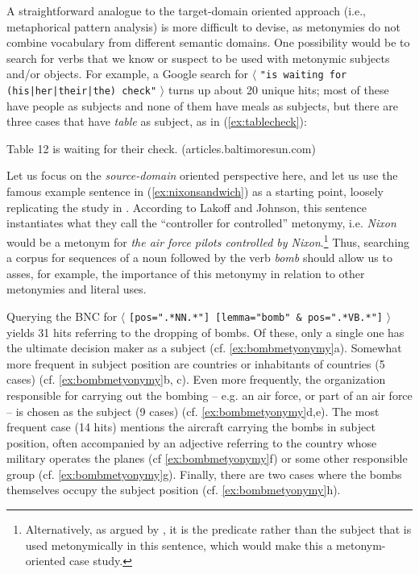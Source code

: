 A straightforward analogue to the target\hyp{}domain oriented approach (i.e., metaphorical  pattern analysis)  is more difficult to devise, as metonymies  do not combine vocabulary from different semantic  domains. One possibility would be to search for verbs  that we know or suspect to be used with metonymic subjects and\slash or objects. For example, a Google search for $\langle$ \texttt{"is waiting for (his|her|their|the) check"} $\rangle$ turns up about 20 unique hits; most of these have people as subjects and none of them have meals as subjects, but there are three cases that have \textit{table} as subject, as in (\ref{ex:tablecheck}):

\begin{exe}
\ex Table 12 is waiting for their check. (articles.baltimoresun.com)
\label{ex:tablecheck}
\end{exe}

Let us focus on the \textit{source\hyp{}domain} oriented perspective here, and let us use the famous example sentence in (\ref{ex:nixonsandwich}) as a starting point, loosely replicating  the study in \citet{stefanowitsch_metonymies_2015}. According to Lakoff and Johnson, this sentence instantiates what they call the ``controller for controlled'' metonymy,  i.e. \textit{Nixon} would be a metonym for \textit{the air force pilots controlled by Nixon}.\footnote{Alternatively, as argued by \citet{stallard_two_1993}, it is the predicate rather than the subject that is used metonymically  in this sentence, which would make this a metonym\hyp{}oriented case study.} Thus, searching a corpus for sequences of a noun  followed by the verb  \textit{bomb} should allow us to asses, for example, the importance of this metonymy  in relation to other metonymies and literal  uses.

Querying the BNC  for $\langle$ \texttt{[pos=".*NN.*"] [lemma="bomb" \& pos=".*VB.*"]} $\rangle$ yields 31 hits referring to the dropping of bombs. Of these, only a single one has the ultimate decision maker as a subject (cf. \ref{ex:bombmetyonymy}a). Somewhat more frequent in subject position are countries or inhabitants of countries (5 cases) (cf. \ref{ex:bombmetyonymy}b, c). Even more frequently, the organization responsible for carrying out the bombing -- e.g. an air force, or part of an air force -- is chosen as the subject (9 cases) (cf. \ref{ex:bombmetyonymy}d,e). The most frequent case (14 hits) mentions the aircraft carrying the bombs in subject position, often accompanied by an adjective  referring to the country whose military operates the planes (cf \ref{ex:bombmetyonymy}f) or some other responsible group (cf. \ref{ex:bombmetyonymy}g). Finally, there are two cases where the bombs themselves occupy the subject position (cf. \ref{ex:bombmetyonymy}h).

